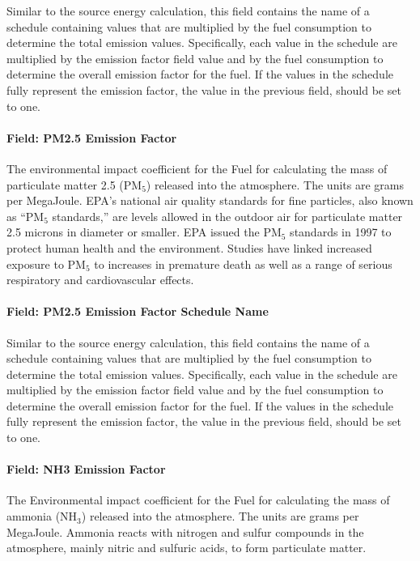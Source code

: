 Similar to the source energy calculation, this field contains the name of a schedule containing values that are multiplied by the fuel consumption to determine the total emission values. Specifically, each value in the schedule are multiplied by the emission factor field value and by the fuel consumption to determine the overall emission factor for the fuel. If the values in the schedule fully represent the emission factor, the value in the previous field, should be set to one.

\paragraph{Field: PM2.5 Emission Factor}\label{field-pm2.5-emission-factor}

The environmental impact coefficient for the Fuel for calculating the mass of particulate matter 2.5 (PM\(_{5}\)) released into the atmosphere. The units are grams per MegaJoule. EPA's national air quality standards for fine particles, also known as ``PM\(_{5}\) standards,'' are levels allowed in the outdoor air for particulate matter 2.5 microns in diameter or smaller. EPA issued the PM\(_{5}\) standards in 1997 to protect human health and the environment. Studies have linked increased exposure to PM\(_{5}\) to increases in premature death as well as a range of serious respiratory and cardiovascular effects.

\paragraph{Field: PM2.5 Emission Factor Schedule Name}\label{field-pm2.5-emission-factor-schedule-name}

Similar to the source energy calculation, this field contains the name of a schedule containing values that are multiplied by the fuel consumption to determine the total emission values. Specifically, each value in the schedule are multiplied by the emission factor field value and by the fuel consumption to determine the overall emission factor for the fuel. If the values in the schedule fully represent the emission factor, the value in the previous field, should be set to one.

\paragraph{Field: NH3 Emission Factor}\label{field-nh3-emission-factor}

The Environmental impact coefficient for the Fuel for calculating the mass of ammonia (NH\(_{3}\)) released into the atmosphere. The units are grams per MegaJoule. Ammonia reacts with nitrogen and sulfur compounds in the atmosphere, mainly nitric and sulfuric acids, to form particulate matter.

